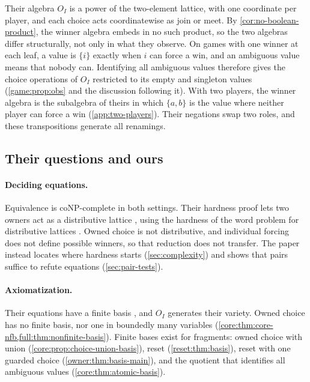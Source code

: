 Their algebra $O_I$ \cite[Definition~3.20]{OldeLoohuisVenema2010} is a power of the two-element lattice, with one coordinate per player, and each choice acts coordinatewise as join or meet. By \cref{cor:no-boolean-product}, the winner algebra embeds in no such product, so the two algebras differ structurally, not only in what they observe. On games with one winner at each leaf, a value is $\{i\}$ exactly when $i$ can force a win, and an ambiguous value means that nobody can. Identifying all ambiguous values therefore gives the choice operations of $O_I$ restricted to its empty and singleton values (\cref{game:prop:obs} and the discussion following it). With two players, the winner algebra is the subalgebra of theirs in which $\{a,b\}$ is the value where neither player can force a win (\cref{app:two-players}). Their negations swap two roles, and these transpositions generate all renamings.

\subsection{Their questions and ours}

\paragraph{Deciding equations.} Equivalence is coNP-complete in both settings. Their hardness proof lets two owners act as a distributive lattice \cite[Theorem~5.50]{OldeLoohuisVenema2010}, using the hardness of the word problem for distributive lattices \cite{BloniarzHuntRosenkrantz1984}. Owned choice is not distributive, and individual forcing does not define possible winners, so that reduction does not transfer. The paper instead locates where hardness starts (\cref{sec:complexity}) and shows that pairs suffice to refute equations (\cref{sec:pair-tests}).

\paragraph{Axiomatization.} Their equations have a finite basis \cite[Definition~3.24]{OldeLoohuisVenema2010}, and $O_I$ generates their variety. Owned choice has no finite basis, nor one in boundedly many variables (\cref{core:thm:core-nfb,full:thm:nonfinite-basis}). Finite bases exist for fragments: owned choice with union (\cref{core:prop:choice-union-basis}), reset (\cref{reset:thm:basis}), reset with one guarded choice (\cref{owner:thm:basis-main}), and the quotient that identifies all ambiguous values (\cref{core:thm:atomic-basis}).

